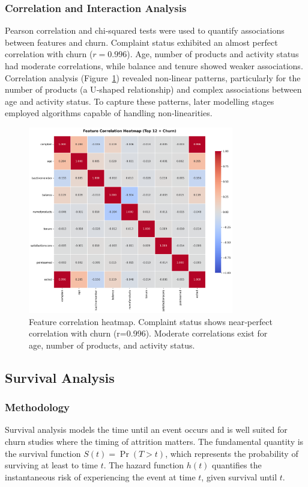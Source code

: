 \documentclass[12pt]{article}
\begin{document}
\subsubsection{Correlation and Interaction Analysis}
Pearson correlation and chi‑squared tests were used to quantify associations between features and churn.  Complaint status exhibited an almost perfect correlation with churn (\(r=0.996\)).  Age, number of products and activity status had moderate correlations, while balance and tenure showed weaker associations.  Correlation analysis (Figure~\ref{fig:correlation}) revealed non‑linear patterns, particularly for the number of products (a U‑shaped relationship) and complex associations between age and activity status.  To capture these patterns, later modelling stages employed algorithms capable of handling non‑linearities.

\begin{figure}[H]
\centering
\includegraphics[width=0.8\textwidth]{img/08_correlation_heatmap.png}
\caption{Feature correlation heatmap. Complaint status shows near‑perfect correlation with churn (r=0.996). Moderate correlations exist for age, number of products, and activity status.}
\label{fig:correlation}
\end{figure}

\subsection{Survival Analysis}
\subsubsection{Methodology}
Survival analysis models the time until an event occurs and is well suited for churn studies where the timing of attrition matters.  The fundamental quantity is the survival function \(S(t) = \Pr(T > t)\), which represents the probability of surviving at least to time \(t\).  The hazard function \(h(t)\) quantifies the instantaneous risk of experiencing the event at time \(t\), given survival until \(t\).
\end{document}
